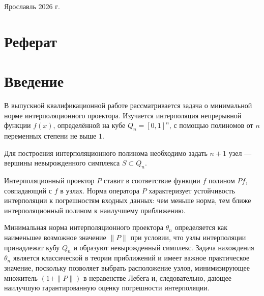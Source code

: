 \documentclass[a4paper,12pt]{article}
\theoremstyle{indented}
\begin{document}
\vspace{0.5cm}
\begin{center}
Ярославль 2026 г.
\end{center}
\newpage

\section*{Реферат}
\newpage

\pagestyle{plain}
\tableofcontents

\newpage

\section*{Введение}

В выпускной квалификационной работе рассматривается задача о минимальной норме интерполяционного проектора. Изучается интерполяция непрерывной функции $f(x)$, определённой на кубе $Q_n = [0,1]^n$, с помощью полиномов от $n$ переменных степени не выше $1$.
\par
Для построения интерполяционного полинома необходимо задать $n+1$ узел — вершины невырожденного симплекса $S \subset Q_n$.
\par
Интерполяционный проектор $P$ ставит в соответствие функции $f$ полином $P f$, совпадающий с $f$ в узлах. Норма оператора $P$ характеризует устойчивость интерполяции к погрешностям входных данных: чем меньше норма, тем ближе интерполяционный полином к наилучшему приближению.

Минимальная норма интерполяционного проектора $\theta_n$ определяется как наименьшее возможное значение $\|P\|$ при условии, что узлы интерполяции принадлежат кубу $Q_n$ и образуют невырожденный симплекс. Задача нахождения $\theta_n$ является классической в теории приближений и имеет важное практическое значение, поскольку позволяет выбрать расположение узлов, минимизирующее множитель $(1 + \|P\|)$ в неравенстве Лебега и, следовательно, дающее наилучшую гарантированную оценку погрешности интерполяции.
\end{document}
